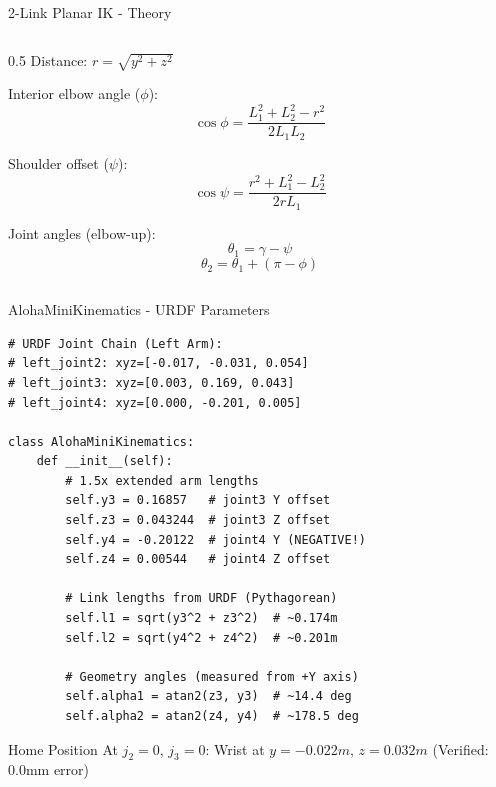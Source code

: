 \begin{frame}{2-Link Planar IK - Theory}
\begin{columns}
\begin{column}{0.5\textwidth}
    {\small Distance:} $r = \sqrt{y^2 + z^2}$

    \vspace{0.1cm}

    {\small Interior elbow angle ($\phi$):}
    \[\cos\phi = \frac{L_1^2 + L_2^2 - r^2}{2 L_1 L_2}\]

    {\small Shoulder offset ($\psi$):}
    \[\cos\psi = \frac{r^2 + L_1^2 - L_2^2}{2 r L_1}\]

    {\small Joint angles (elbow-up):}
    \[\theta_1 = \gamma - \psi\]
    \[\theta_2 = \theta_1 + (\pi - \phi)\]
\end{column}
\end{columns}
\end{frame}

\begin{frame}[fragile,shrink=5]{AlohaMiniKinematics - URDF Parameters}
\begin{lstlisting}[basicstyle=\ttfamily\scriptsize]
# URDF Joint Chain (Left Arm):
# left_joint2: xyz=[-0.017, -0.031, 0.054]
# left_joint3: xyz=[0.003, 0.169, 0.043]
# left_joint4: xyz=[0.000, -0.201, 0.005]

class AlohaMiniKinematics:
    def __init__(self):
        # 1.5x extended arm lengths
        self.y3 = 0.16857   # joint3 Y offset
        self.z3 = 0.043244  # joint3 Z offset
        self.y4 = -0.20122  # joint4 Y (NEGATIVE!)
        self.z4 = 0.00544   # joint4 Z offset

        # Link lengths from URDF (Pythagorean)
        self.l1 = sqrt(y3^2 + z3^2)  # ~0.174m
        self.l2 = sqrt(y4^2 + z4^2)  # ~0.201m

        # Geometry angles (measured from +Y axis)
        self.alpha1 = atan2(z3, y3)  # ~14.4 deg
        self.alpha2 = atan2(z4, y4)  # ~178.5 deg
\end{lstlisting}

\vspace{0.15cm}

\begin{block}{Home Position}
At $j_2=0$, $j_3=0$: Wrist at $y=-0.022m$, $z=0.032m$ (Verified: 0.0mm error)
\end{block}
\end{frame}

